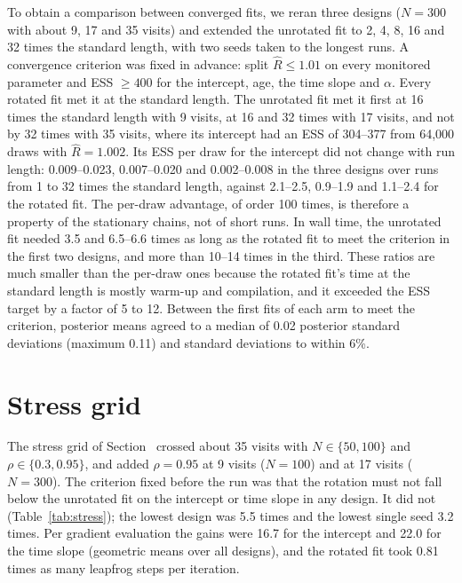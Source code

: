 To obtain a comparison between converged fits, we reran three designs
($N = 300$ with about 9, 17 and 35 visits) and extended the unrotated fit
to 2, 4, 8, 16 and 32 times the standard length, with two seeds taken to
the longest runs. A convergence criterion was fixed in advance: split $\hat
R \leq 1.01$ on every monitored parameter and ESS $\geq 400$ for the
intercept, age, the time slope and $\alpha$. Every rotated fit met it at
the standard length. The unrotated fit met it first at 16 times the
standard length with 9 visits, at 16 and 32 times with 17 visits, and not
by 32 times with 35 visits, where its intercept had an ESS of 304--377 from
64,000 draws with $\hat R = 1.002$. Its ESS per draw for the intercept did
not change with run length: 0.009--0.023, 0.007--0.020 and 0.002--0.008 in
the three designs over runs from 1 to 32 times the standard length, against
2.1--2.5, 0.9--1.9 and 1.1--2.4 for the rotated fit. The per-draw advantage,
of order 100 times, is therefore a property of the stationary chains, not
of short runs. In wall time, the unrotated fit needed 3.5 and 6.5--6.6
times as long as the rotated fit to meet the criterion in the first two
designs, and more than 10--14 times in the third. These ratios are much
smaller than the per-draw ones because the rotated fit's time at the
standard length is mostly warm-up and compilation, and it exceeded the ESS
target by a factor of 5 to 12. Between the first fits of each arm to meet
the criterion, posterior means agreed to a median of 0.02 posterior
standard deviations (maximum 0.11) and standard deviations to within 6\%.

\section{Stress grid}\label{sec:stressgrid}

The stress grid of Section~ crossed about 35 visits with
$N \in \{50, 100\}$ and $\rho \in \{0.3, 0.95\}$, and added $\rho = 0.95$
at 9 visits ($N = 100$) and at 17 visits ($N = 300$). The criterion fixed before the
run was that the rotation must not fall below the unrotated fit on the
intercept or time slope in any design. It did not (Table~\ref{tab:stress});
the lowest design was 5.5 times and the lowest single seed 3.2 times. Per
gradient evaluation the gains were 16.7 for the intercept and 22.0 for the
time slope (geometric means over all designs), and the rotated fit took
0.81 times as many leapfrog steps per iteration.

